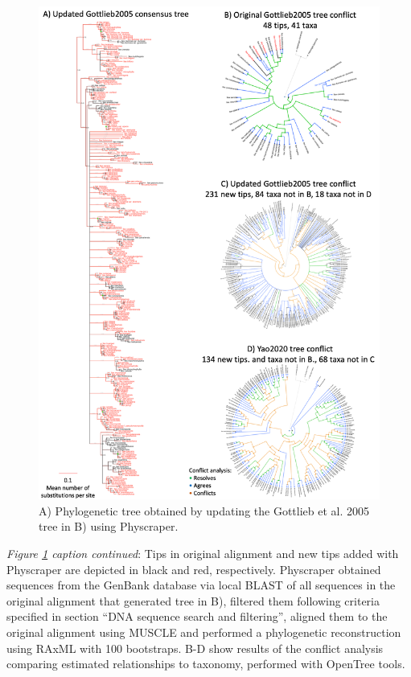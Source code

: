 \documentclass[]{article}
\begin{document}
\begin{figure}
\includegraphics[width=1\linewidth]{docs/figs/ilex-results} \caption{A) Phylogenetic tree obtained by updating the Gottlieb et al. 2005 tree in B) using Physcraper.}\label{fig:results}
\end{figure}

\newpage

\emph{Figure \ref{fig:results} caption continued}: Tips in original alignment and new tips added with Physcraper are depicted in black and red, respectively. Physcraper obtained sequences from the GenBank database via local BLAST of all sequences in the original alignment that generated tree in B), filtered them following criteria specified in section ``DNA sequence search and filtering'', aligned them to the original alignment using MUSCLE and performed a phylogenetic reconstruction using RAxML with 100 bootstraps. B-D show results of the conflict analysis comparing estimated relationships to taxonomy, performed with OpenTree tools.
\end{document}
